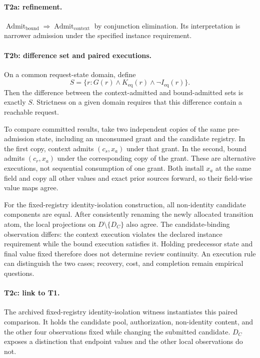 \paragraph{T2a: refinement.}
$\operatorname{Admit}_{\mathrm{bound}}\Rightarrow
\operatorname{Admit}_{\mathrm{context}}$ by conjunction elimination. Its interpretation is narrower admission under the specified instance requirement.

\paragraph{T2b: difference set and paired executions.}
On a common request-state domain, define
\[
 S=\{r:G(r)\land K_{\mathrm{eq}}(r)\land\neg I_{\mathrm{eq}}(r)\}.
\]
Then the difference between the context-admitted and bound-admitted sets is exactly $S$. Strictness on a given domain requires that this difference contain a reachable request.

To compare committed results, take two independent copies of the same pre-admission state, including an unconsumed grant and the candidate registry. In the first copy, context admits $(c_s,x_a)$ under that grant. In the second, bound admits $(c_r,x_a)$ under the corresponding copy of the grant. These are alternative executions, not sequential consumption of one grant. Both install $x_a$ at the same field and copy all other values and exact prior sources forward, so their field-wise value maps agree.

For the fixed-registry identity-isolation construction, all non-identity candidate components are equal. After consistently renaming the newly allocated transition atom, the local projections on $D\setminus\{D_C\}$ also agree. The candidate-binding observation differs: the context execution violates the declared instance requirement while the bound execution satisfies it. Holding predecessor state and final value fixed therefore does not determine review continuity. An execution rule can distinguish the two cases; recovery, cost, and completion remain empirical questions.

\paragraph{T2c: link to T1.}
The archived fixed-registry identity-isolation witness instantiates this paired comparison. It holds the candidate pool, authorization, non-identity content, and the other four observations fixed while changing the submitted candidate. $D_C$ exposes a distinction that endpoint values and the other local observations do not.

